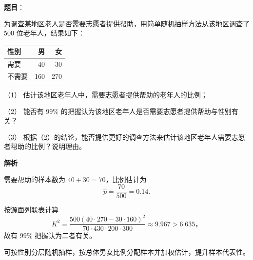 \begin{answer}

\textbf{题目}：

为调查某地区老人是否需要志愿者提供帮助，用简单随机抽样方法从该地区调查了 $500$ 位老年人，结果如下：

\begin{center}
\begin{tabular}{lrr}
\toprule
性别 & 男 & 女 \\
\midrule
需要 & 40 & 30 \\
不需要 & 160 & 270 \\
\bottomrule
\end{tabular}
\end{center}

（1） 估计该地区老年人中，需要志愿者提供帮助的老年人的比例；

（2） 能否有 $99\%$ 的把握认为该地区老年人是否需要志愿者提供帮助与性别有关？

（3） 根据（2）的结论，能否提供更好的调查方法来估计该地区老年人需要志愿者帮助的比例？说明理由。

\textbf{解析}


需要帮助的样本数为 $40+30=70$，比例估计为
\nopagebreak[4]
\[\hat p=\frac{70}{500}=0.14.
\]


按源面列联表计算
\nopagebreak[4]
\[
K^2=\frac{500(40\cdot270-30\cdot160)^2}
{70\cdot430\cdot200\cdot300}\approx9.967>6.635\text{，}
\]
故有 $99\%$ 把握认为二者有关。


可按性别分层随机抽样，按总体男女比例分配样本并加权估计，提升样本代表性。




\end{answer}
